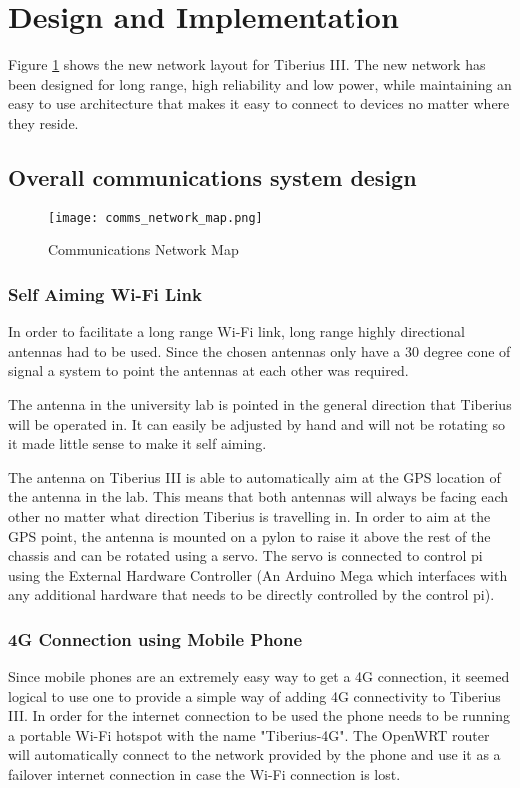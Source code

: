 \section{Design and Implementation}

Figure \ref{fig:comms_network_map} shows the new network layout for Tiberius III. The new network has been designed for long range, high reliability and low power, while maintaining an easy to use architecture that makes it easy to connect to devices no matter where they reside.
\subsection{Overall communications system design}
\begin{figure}[!htb]
\begin{center}
\texttt{[image: comms\_network\_map.png]}
\end{center}
\caption{Communications Network Map}
\label{fig:comms_network_map}
\end{figure}




\subsubsection{Self Aiming Wi-Fi Link}
In order to facilitate a long range Wi-Fi link, long range highly directional antennas had to be used. Since the chosen antennas only have a 30 degree cone of signal  a system to point the antennas at each other was required.

The antenna in the university lab is pointed in the general direction that Tiberius will be operated in. It can easily be adjusted by hand and will not be rotating so it made little sense to make it self aiming.

The antenna on Tiberius III is able to automatically aim at the GPS location of the antenna in the lab. This means that both antennas will always be facing each other no matter what direction Tiberius is travelling in. In order to aim at the GPS point, the antenna is mounted on a pylon to raise it above the rest of the chassis and can be rotated using a servo. The servo is connected to control pi using the External Hardware Controller (An Arduino Mega which interfaces with any additional hardware that needs to be directly controlled by the control pi).

\subsubsection{4G Connection using Mobile Phone}
Since mobile phones are an extremely easy way to get a 4G connection, it seemed logical to use one to provide a simple way of adding 4G connectivity to Tiberius III. In order for the internet connection to be used the phone needs to be running a portable Wi-Fi hotspot with the name "Tiberius-4G". The OpenWRT router will automatically connect to the network provided by the phone and use it as a failover internet connection in case the Wi-Fi connection is lost.

